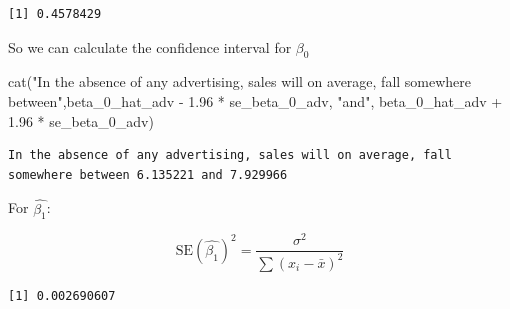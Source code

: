 \documentclass[
  letterpaper,
  DIV=11,
  numbers=noendperiod]{scrreprt}
\newenvironment{Shaded}{\begin{snugshade}}{\end{snugshade}}
\newcommand{\DecValTok}[1]{\textcolor[rgb]{0.47,0.16,0.63}{#1}}
\newcommand{\FloatTok}[1]{\textcolor[rgb]{0.65,0.35,0.00}{#1}}
\newcommand{\FunctionTok}[1]{\textcolor[rgb]{0.02,0.16,0.49}{#1}}
\newcommand{\NormalTok}[1]{\textcolor[rgb]{0.33,0.33,0.33}{#1}}
\newcommand{\OtherTok}[1]{\textcolor[rgb]{0.85,0.12,0.09}{#1}}
\newcommand{\SpecialCharTok}[1]{\textcolor[rgb]{0.00,0.46,0.62}{#1}}
\newcommand{\StringTok}[1]{\textcolor[rgb]{0.00,0.50,0.00}{#1}}
\begin{document}
\begin{verbatim}
[1] 0.4578429
\end{verbatim}

So we can calculate the confidence interval for \(\beta_0\)

\begin{Shaded}
\begin{Highlighting}[]
\FunctionTok{cat}\NormalTok{(}\StringTok{"In the absence of any advertising, sales will on average, fall somewhere between"}\NormalTok{,beta\_0\_hat\_adv }\SpecialCharTok{{-}} \FloatTok{1.96} \SpecialCharTok{*}\NormalTok{ se\_beta\_0\_adv, }\StringTok{"and"}\NormalTok{, beta\_0\_hat\_adv }\SpecialCharTok{+} \FloatTok{1.96} \SpecialCharTok{*}\NormalTok{ se\_beta\_0\_adv)}
\end{Highlighting}
\end{Shaded}

\begin{verbatim}
In the absence of any advertising, sales will on average, fall somewhere between 6.135221 and 7.929966
\end{verbatim}

For \(\hat{\beta_1}\):

\[
\text{SE}(\hat{\beta_1})^2 =\frac{\sigma^2}{\sum(x_i - \bar{x})^2}
\]

\begin{Shaded}
\end{Shaded}

\begin{verbatim}
[1] 0.002690607
\end{verbatim}

\begin{Shaded}
\end{Shaded}
\end{document}
